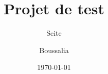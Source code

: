 %
%
%
%




\usepackage[T1]{fontenc}
\usepackage[utf8]{inputenc}

\title{Projet de test}
\author{Seite \and Boussalia}
\date{\today}





\maketitle
\tableofcontents



















